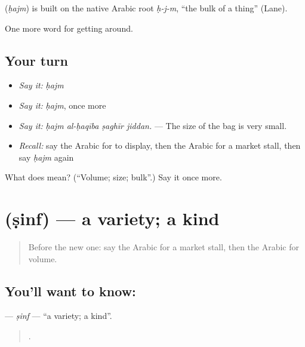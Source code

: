 \begin{cousinweb}
\textbf{} (\emph{ḥajm}) is built on the native Arabic root \emph{ḥ-j-m}, \textquotedblleft{}the bulk of a thing\textquotedblright{} (Lane).
\end{cousinweb}

\begin{grammarlens}[title={What you've built}]
One more word for getting around.
\end{grammarlens}

\subsection*{Your turn}
\begin{itemize}
\raggedright
  \item \emph{Say it:} \emph{ḥajm}
  \item \emph{Say it:} \emph{ḥajm}, once more
  \item \emph{Say it:} \emph{ḥajm al-ḥaqība ṣaghīr jiddan.} — The size of the bag is very small.
  \item \emph{Recall:} say the Arabic for to display, then the Arabic for a market stall, then say \emph{ḥajm} again
\end{itemize}

\begin{tcolorbox}[breakable,colback=teal!4,colframe=teal!35!black,title={Before you move on}]
What does  mean? (\textquotedblleft{}Volume; size; bulk\textquotedblright{}.) Say it once more.
\end{tcolorbox}
\section[\texorpdfstring{\ar{صنف} (ṣinf)}{صنف (ṣinf)}]{ (ṣinf) — a variety; a kind}

\label{lesson:AR-C456-sinf}



\begin{quote}
Before the new one: say the Arabic for a market stall, then the Arabic for volume.
\end{quote}

\subsection*{You'll want to know: }
\textbf{} — \emph{ṣinf} — \textquotedblleft{}a variety; a kind\textquotedblright{}.

\begin{quote}
    .
\end{quote}

